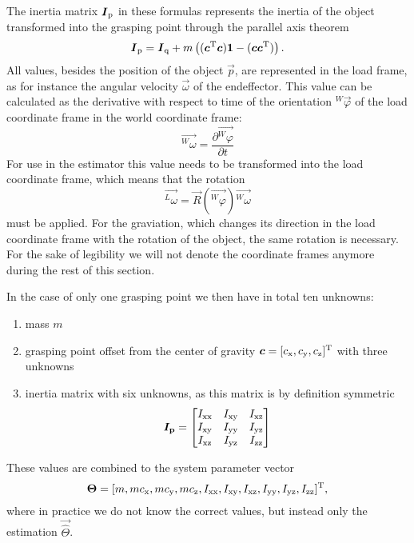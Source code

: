 The inertia matrix $\boldsymbol{I}_{\mathrm{p}}$ in these formulas represents the inertia of the object transformed into the grasping point through the parallel axis theorem
\begin{equation}
	\boldsymbol{I}_{\mathrm{p}} = \boldsymbol{I}_{\mathrm{q}} + m \left( (\boldsymbol{c}^{\mathrm{T}} \boldsymbol{c}) \boldsymbol{1} - (\boldsymbol{c} \boldsymbol{c}^{\mathrm{T}}) \right).
\end{equation}
All values, besides the position of the object $\vec p$, are represented in the load frame, as for instance the angular velocity $\vec \omega$ of the endeffector. This value can be calculated as the derivative with respect to time of the orientation $^W\vec{\varphi}$ of the load coordinate frame in the world coordinate frame:
\begin{equation}
	\vec{^W\omega} = \frac{\partial \vec{^W\varphi}}{\partial t}
\end{equation}
For use in the estimator this value needs to be transformed into the load coordinate frame, which means that the rotation
\begin{equation}
	\vec{^L\omega} = \vec{R}(\vec{^W\varphi}) \vec{^W\omega}
\end{equation}
must be applied. For the graviation, which changes its direction in the load coordinate frame with the rotation of the object, the same rotation is necessary. For the sake of legibility we will not denote the coordinate frames anymore during the rest of this section.

In the case of only one grasping point we then have in total ten unknowns:
\begin{enumerate}
	\item mass $m$
	\item grasping point offset from the center of gravity $\boldsymbol{c} = [c_{\mathrm{x}}, c_{\mathrm{y}}, c_{\mathrm{z}}]^{\mathrm{T}}$ with three unknowns
	\item inertia matrix with six unknowns, as this matrix is by definition symmetric
	\begin{equation}
		\boldsymbol{I_{\mathrm{p}}} = 
		\begin{bmatrix}	
			I_{\mathrm{xx}}	& I_{\mathrm{xy}}	& I_{\mathrm{xz}} \\
			I_{\mathrm{xy}}	& I_{\mathrm{yy}}	& I_{\mathrm{yz}} \\
			I_{\mathrm{xz}}	& I_{\mathrm{yz}}	& I_{\mathrm{zz}}
		\end{bmatrix}
	\end{equation}
\end{enumerate}

These values are combined to the system parameter vector
\begin{equation}
	\boldsymbol{\Theta} = [m, m c_{\mathrm{x}}, m c_{\mathrm{y}}, m c_{\mathrm{z}}, I_{\mathrm{xx}}, I_{\mathrm{xy}}, I_{\mathrm{xz}}, I_{\mathrm{yy}},I_{\mathrm{yz}}, I_{\mathrm{zz}}]^{\mathrm{T}},
\end{equation}
where in practice we do not know the correct values, but instead only the estimation $\vec{\hat \Theta}$.

